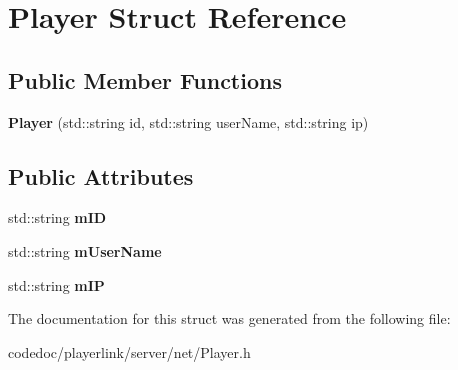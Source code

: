 \hypertarget{structPlayer}{}\section{Player Struct Reference}
\label{structPlayer}
\subsection*{Public Member Functions}
\begin{DoxyCompactItemize}
\item 
\mbox{\label{structPlayer_a3f5009639791e3d97d8c1fcc2ad0a1de}} 
{\bfseries Player} (std\+::string id, std\+::string user\+Name, std\+::string ip)
\end{DoxyCompactItemize}
\subsection*{Public Attributes}
\begin{DoxyCompactItemize}
\item 
\mbox{\label{structPlayer_ad870fdae1431c8f66eb61ee2739ddae9}} 
std\+::string {\bfseries m\+ID}
\item 
\mbox{\label{structPlayer_a4e084ad7304f9f78d4ea244bf751e869}} 
std\+::string {\bfseries m\+User\+Name}
\item 
\mbox{\label{structPlayer_a3e64a31ab46a3e5e31d2dcc6c07c5f66}} 
std\+::string {\bfseries m\+IP}
\end{DoxyCompactItemize}


The documentation for this struct was generated from the following file\+:\begin{DoxyCompactItemize}
\item 
codedoc/playerlink/server/net/Player.\+h\end{DoxyCompactItemize}
